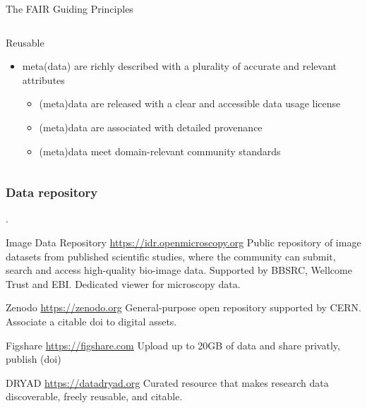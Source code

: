 \documentclass[ignorenonframetext,aspectratio=169,10pt,xcolor=table]{beamer}
\begin{document}
\begin{frame}{The FAIR Guiding Principles}
\begin{columns}
\begin{column}{0.5\textwidth}
    \begin{block}{Reusable}
      \begin{itemize}
      \item meta(data) are richly described with a plurality of accurate and relevant attributes
        \begin{itemize}  \scriptsize
        \item (meta)data are released with a clear and accessible data usage license
        \item (meta)data are associated with detailed provenance
        \item (meta)data meet domain-relevant community standards
        \end{itemize}
      \end{itemize}
    \end{block}
  \end{column}
  \end{columns}

  \end{frame}


\begin{frame} \frametitle{Data repository}

  .

  \begin{block}{Image Data Repository \url{https://idr.openmicroscopy.org}}
    Public repository of image datasets from published scientific studies, where
    the community can submit, search and access high-quality bio-image data.
    Supported by BBSRC, Wellcome Trust and EBI. Dedicated viewer for microscopy data.
  \end{block}

  \begin{block}{Zenodo \url{https://zenodo.org}}
    General-purpose open repository supported by CERN. Associate a citable doi
    to digital assets.
  \end{block}

  \begin{block}{Figshare \url{https://figshare.com}}
    Upload up to 20GB of data and share privatly, publish (doi)
  \end{block}

  \begin{block}{DRYAD \url{https://datadryad.org}}
    Curated resource that makes research data discoverable, freely reusable, and citable.
  \end{block}


\end{frame}
\end{document}
